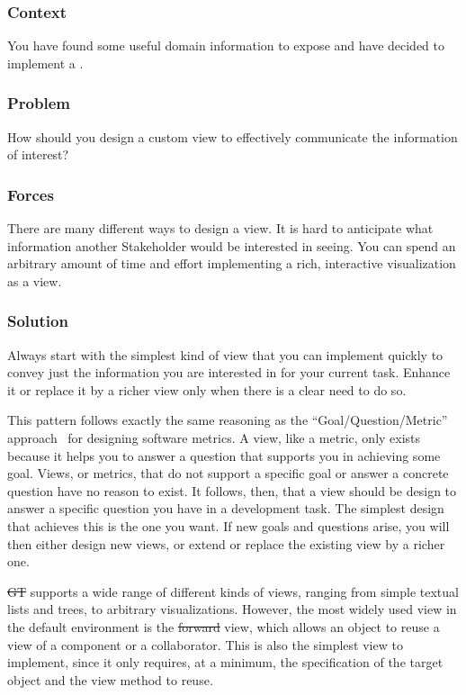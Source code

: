 \documentclass[sigconf]{acmart}
\newcommand{\pattern}[1]{\emph{\nameref{pat:#1}}\xspace}
\newcommand{\GT}{\st{GT}\xspace} %
\begin{document}
\subsubsection*{Context}
You have found some useful domain information to expose and have decided to implement a \pattern{customView}.

\subsubsection*{Problem}
How should you design a custom view to effectively communicate the information of interest?

\subsubsection*{Forces}
There are many different ways to design a view.
It is hard to anticipate what information another Stakeholder would be interested in seeing.
You can spend an arbitrary amount of time and effort implementing a rich, interactive visualization as a view.

\subsubsection*{Solution}
Always start with the simplest kind of view that you can implement quickly to convey just the information you are interested in for your current task.
Enhance it or replace it by a richer view only when there is a clear need to do so.

This pattern follows exactly the same reasoning as the ``Goal/Question/Metric'' approach~\cite{Basi94a} for designing software metrics.
A view, like a metric, only exists because it helps you to answer a question that supports you in achieving some goal.
Views, or metrics, that do not support a specific goal or answer a concrete question have no reason to exist.
It follows, then, that a view should be design to answer a specific question you have in a development task.
The simplest design that achieves this is the one you want.
If new goals and questions arise, you will then either design new views, or extend or replace the existing view by a richer one.

\GT supports a wide range of different kinds of views, ranging from simple textual lists and trees, to arbitrary visualizations.
However, the most widely used view in the default environment is the \st{forward} view, which allows an object to reuse a view of a component or a collaborator.
This is also the simplest view to implement, since it only requires, at a minimum, the specification of the target object and the view method to reuse.
\end{document}
